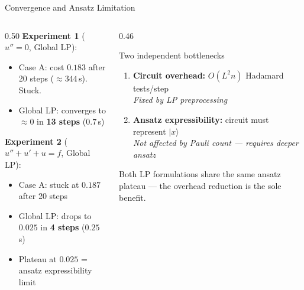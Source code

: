 \documentclass{beamer}
\begin{document}
\begin{frame}{Convergence and Ansatz Limitation}

  \begin{columns}
    \begin{column}{0.50\textwidth}
      \textbf{Experiment 1} ($u''=0$, Global LP):
      \begin{itemize}
        \item Case A: cost $0.183$ after 20 steps (${\approx}344$\,s). Stuck.
        \item Global LP: converges to ${\approx}0$ in \textbf{13 steps} ($0.7$\,s)
      \end{itemize}

      \vspace{6pt}
      \textbf{Experiment 2} ($u''+u'+u=f$, Global LP):
      \begin{itemize}
        \item Case A: stuck at $0.187$ after 20 steps
        \item Global LP: drops to $0.025$ in \textbf{4 steps} ($0.25$\,s)
        \item Plateau at $0.025$ = ansatz expressibility limit
      \end{itemize}
    \end{column}
    \begin{column}{0.46\textwidth}
      \begin{block}{Two independent bottlenecks}
        \begin{enumerate}
          \item \textbf{Circuit overhead:} $O(L^2 n)$ Hadamard tests/step\\
                \emph{Fixed by LP preprocessing}
          \item \textbf{Ansatz expressibility:} circuit must represent $|x\rangle$\\
                \emph{Not affected by Pauli count — requires deeper ansatz}
        \end{enumerate}
      \end{block}
      \vspace{4pt}
      Both LP formulations share the same ansatz plateau —
      the overhead reduction is the sole benefit.
    \end{column}
  \end{columns}
\end{frame}

\end{document}

